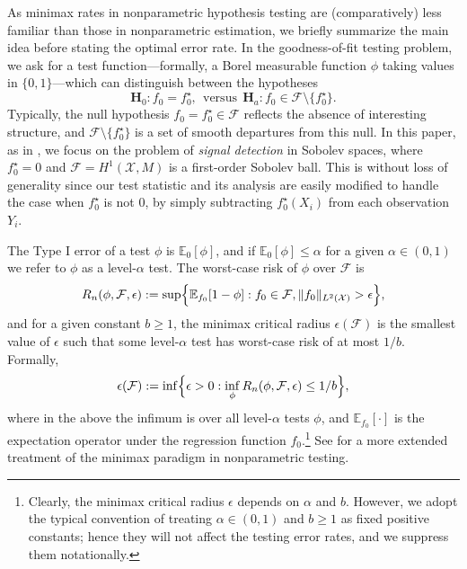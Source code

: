 \documentclass[twoside]{article}
\newcommand{\1}{\mathbf{1}}
\newcommand{\Xset}{\mathcal{X}}
\newcommand{\Leb}{L}
\newcommand{\mc}[1]{\mathcal{#1}}
\newcommand{\Ebb}{\mathbb{E}}
\theoremstyle{definition}
\theoremstyle{remark}
\begin{document}
As minimax rates in nonparametric hypothesis testing are (comparatively) less familiar than those in nonparametric estimation, we briefly summarize the main idea before stating the optimal error rate. In the goodness-of-fit testing problem, we ask for a test function---formally, a Borel measurable function $\phi$ taking values in $\{0,1\}$---which can distinguish between the hypotheses
\begin{equation}
\mathbf{H}_0: f_0 = f_0^{\star}, ~~\textrm{versus}~~ \mathbf{H}_a: f_0 \in \mc{F} \setminus \{f_0^{\star}\}.
\end{equation} 
Typically, the null hypothesis $f_0 = f_0^{\star} \in \mc{F}$ reflects the absence of interesting structure, and $\mc{F} \setminus  \{f_0^{\star}\}$ is a set of smooth departures from this null. In this paper, as in \citet{ingster2009}, we focus on the problem of \emph{signal detection} in Sobolev spaces, where $f_0^{\star} = 0$ and $\mc{F} = H^1(\Xset,M)$ is a first-order Sobolev ball. This is without loss of generality since our test statistic and its analysis are easily modified to handle the case when $f_0^{\star}$ is not $0$, by simply subtracting $f_0^{\star}(X_i)$ from each observation $Y_i$.



The Type I error of a test $\phi$ is $\mathbb{E}_0[\phi]$, and if $\mathbb{E}_0[\phi] \leq \alpha$ for a given $\alpha \in (0,1)$ we refer to $\phi$ as a level-$\alpha$ test. The worst-case risk of $\phi$ over $\mc{F}$ is
\begin{equation*}
R_n(\phi, \mc{F}, \epsilon) := \sup\Bigl\{\mathbb{E}_{f_0}[1 - \phi]: f_0 \in \mc{F}, \|f_0\|_{\Leb^2(\mc{X})} > \epsilon\Bigr\},
\end{equation*}
and for a given constant $b \geq 1$, the minimax critical radius $\epsilon(\mc{F})$ is the smallest value of $\epsilon$ such that some level-$\alpha$ test has worst-case risk of at most $1/b$. Formally,
\begin{equation*}
\epsilon(\mc{F}) := \inf\Bigl\{\epsilon > 0: \inf_{\phi} R_n(\phi,\mc{F},\epsilon) \leq 1/b \Bigr\},
\end{equation*} 
where in the above the infimum is over all level-$\alpha$ tests $\phi$, and $\Ebb_{f_0}[\cdot]$ is the expectation operator under the regression function $f_0$.\footnote{Clearly, the minimax critical radius $\epsilon$ depends on $\alpha$ and $b$. However, we adopt the typical convention of treating $\alpha \in (0,1)$ and $b \geq 1$ as fixed positive constants; hence they will not affect the testing error rates, and we suppress them notationally.} See \citet{ingster82,ingster87,ingster2012} for a more extended treatment of the minimax paradigm in nonparametric testing. 
\end{document}
